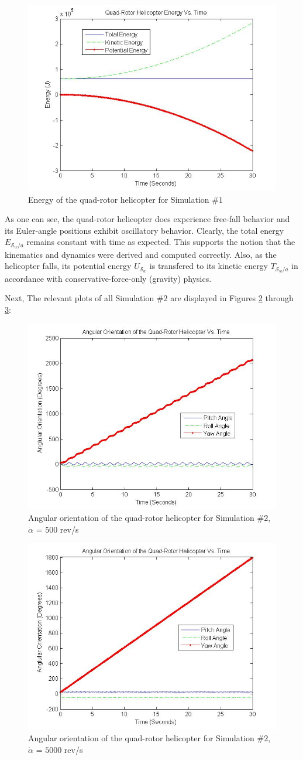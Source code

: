 \documentclass[journal]{IEEEtran}
\begin{document}
\begin{figure}[ht!!!!]
    \centering
        \includegraphics[width=.30\textwidth]{energynoforcealpha50}
    \caption{Energy of the quad-rotor helicopter for Simulation $\#1$}
    \label{fig:energynoforcealpha50}
\end{figure}

As one can see, the quad-rotor helicopter does experience free-fall behavior and its Euler-angle positions exhibit oscillatory behavior. Clearly, the total energy $E_{\mathcal{S}_w/a}$ remains constant with time as expected. This supports the notion that the kinematics and dynamics were derived and computed correctly. Also, as the helicopter falls, its potential energy $U_{\mathcal{S}_w}$ is transfered to its kinetic energy $T_{\mathcal{S}_w/a}$ in accordance with conservative-force-only (gravity) physics. 

Next, The relevant plots of all Simulation $\#2$ are displayed in Figures \ref{fig:angoriennoforcealpha500} through \ref{fig:angoriennoforcealpha5000}:

\begin{figure}[ht!!!!]
    \centering
        \includegraphics[width=.30\textwidth]{angoriennoforcealpha500}
    \caption{Angular orientation of the quad-rotor helicopter for Simulation $\#2$, $\dot{\alpha}$ = $500$ rev/s}
    \label{fig:angoriennoforcealpha500}
\end{figure}

\begin{figure}[ht!!!!]
    \centering
        \includegraphics[width=.30\textwidth]{angoriennoforcealpha5000}
    \caption{Angular orientation of the quad-rotor helicopter for Simulation $\#2$, $\dot{\alpha}$ = $5000$ rev/s}
    \label{fig:angoriennoforcealpha5000}
\end{figure}
\end{document}
